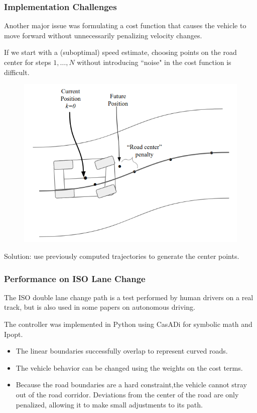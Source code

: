 \documentclass{beamer}
\begin{document}
\begin{frame}
\frametitle{Implementation Challenges}
Another major issue was formulating a cost function that causes the vehicle to move forward without  unnecessarily penalizing velocity changes.

If we start with a (suboptimal) speed estimate, choosing points on the road center for steps $1,\dots,N$ without introducing ``noise" in the cost function is difficult.


\begin{figure}
	\includegraphics[width=0.55\linewidth]{figures/centering_issue.png}
\end{figure}
\vspace{-0.5em}

Solution: use previously computed trajectories to generate the center points.

\end{frame}


\begin{frame}
\frametitle{Performance on ISO Lane Change}
The ISO double lane change path is a test performed by human drivers on a real track, but is also used in some papers on autonomous driving.

The controller was implemented in Python using CasADi for symbolic math and Ipopt.
\begin{itemize}
	\item The linear boundaries successfully overlap to represent curved roads.
	\item The vehicle behavior can be changed using the weights on the cost terms.
	\item Because the road boundaries are a hard constraint,the vehicle cannot stray out of the road corridor. Deviations from the center of the road are only penalized, allowing it to make small adjustments to its path.
\end{itemize}
\end{frame}
\end{document}
